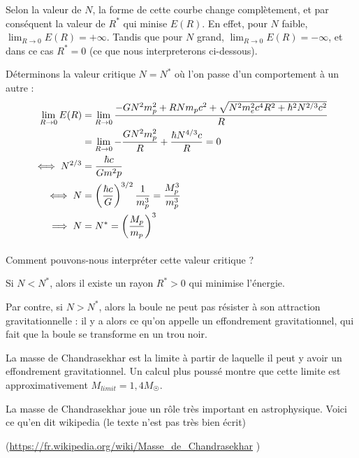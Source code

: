 \documentclass{book}
\begin{document}
Selon la valeur de $N$, la forme de cette courbe change complètement, et par conséquent la valeur de $R^*$ qui minise $E(R)$.
En effet, pour $N$ faible, $\lim_{R\to 0} E(R) = + \infty$. Tandis que pour 
$N$ grand, $\lim_{R\to 0} E(R) = - \infty$, et dans ce cas $R^*=0$ (ce que nous interpreterons ci-dessous).

Déterminons la valeur critique  $N = N^*$ où l'on passe d'un comportement à un autre : 
\begin{align}
\lim_{R\to 0} E(R) &= \lim_{R\to 0} \frac{-GN^2m^2_p + RNm_pc^2 + \sqrt{N^2m^2_ec^4R^2 + \hbar^2 N^{2/3} c^2}}{R} \notag \\
&= \lim_{R\to 0} - \frac{GN^2 m_p^2}{R} + \frac{\hbar N^{4/3} c}{R} = 0 \notag \\
\iff N^{2/3} &= \frac{\hbar c}{Gm^2p} \notag \\
\iff N &= \left( \frac{\hbar c}{G} \right)^{3/2} \frac{1}{m_p^3} = \frac{M_{p}^3}{m_p^3} \notag \\
\implies N &= N^* = \left( \frac{M_p}{m_p} \right)^3
\end{align}


\paragraph{} Comment pouvons-nous interpréter cette valeur critique ? 

Si $N < N^*$, alors il existe un rayon $R^*>0$ qui minimise l'énergie.


Par contre, si $N > N^*$, alors la boule ne peut pas résister à son attraction gravitationnelle : il y a alors ce qu'on appelle un effondrement gravitationnel, qui fait que la boule se transforme en un trou noir. 

La masse de Chandrasekhar est la  limite à partir de laquelle il peut y avoir un effondrement gravitationnel. Un calcul plus poussé montre que cette limite est approximativement $M_{limit}=1,4 M_{\astrosun}$. 


La masse de Chandrasekhar joue un rôle très important en astrophysique. Voici ce qu'en dit wikipedia (le texte n'est pas très bien écrit)

(\url{https://fr.wikipedia.org/wiki/Masse_de_Chandrasekhar}
)
\end{document}
